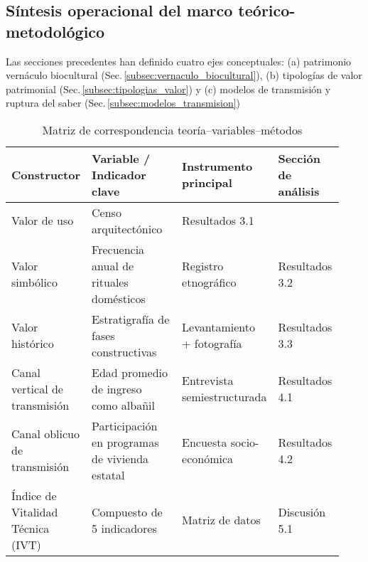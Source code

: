 \subsection{Síntesis operacional del marco teórico-metodológico}
\label{subsec:sintesis_operacional}

Las secciones precedentes han definido cuatro ejes conceptuales:
(a) patrimonio vernáculo biocultural (Sec.\,\ref{subsec:vernaculo_biocultural}),
(b) tipologías de valor patrimonial (Sec.\,\ref{subsec:tipologias_valor}) y
(c) modelos de transmisión y ruptura del saber (Sec.\,\ref{subsec:modelos_transmision})

\begin{table}[ht]
	\centering
	\caption{Matriz de correspondencia teoría–variables–métodos}
	\vspace{0.25cm}
	\label{tab:matriz_operacional}
	\begin{tabular}{p{0.22\linewidth} p{0.28\linewidth} p{0.23\linewidth} p{0.20\linewidth}}
		\hline
		\textbf{Constructor}                           &
		\textbf{Variable / Indicador clave}            &
		\textbf{Instrumento principal}                 &
		\textbf{Sección de análisis}                     \\
		\hline
		Valor de uso \citep{riegl1903}                 &
		Censo arquitectónico                           &
		Resultados 3.1                                   \\
		\hline
		Valor simbólico \citep{delatorre2002values}    &
		Frecuencia anual de rituales domésticos        &
		Registro etnográfico                           &
		Resultados 3.2                                   \\
		\hline
		Valor histórico                                &
		Estratigrafía de fases constructivas           &
		Levantamiento + fotografía                     &
		Resultados 3.3                                   \\
		\hline
		Canal vertical de transmisión                  &
		Edad promedio de ingreso como albañil          &
		Entrevista semiestructurada                    &
		Resultados 4.1                                   \\
		\hline
		Canal oblicuo de transmisión                   &
		Participación en programas de vivienda estatal &
		Encuesta socio-económica                       &
		Resultados 4.2                                   \\
		\hline
		Índice de Vitalidad Técnica (IVT)              &
		Compuesto de 5 indicadores\footnotemark[1]     &
		Matriz de datos                                &
		Discusión 5.1                                    \\
		\hline
	\end{tabular}
\end{table}

